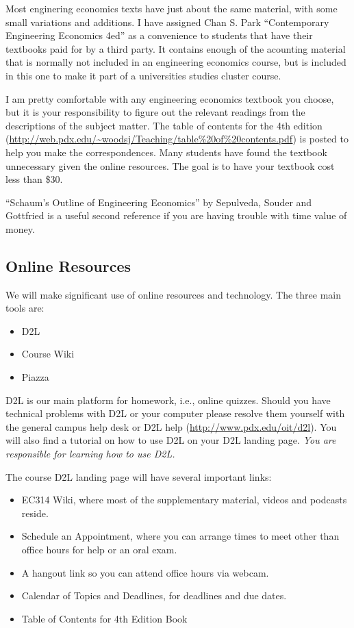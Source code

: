 \documentclass[letterpaper,10pt]{article}
\newif\ifonline
\begin{document}
Most enginering economics texts have just about the same material, with some small variations and additions. I have assigned Chan S. Park ``Contemporary Engineering Economics
4ed'' as a convenience to students that have their textbooks paid for by a third party. It contains enough of the acounting material that is normally not included in an engineering economics course, but is included in this one to make it part of a universities studies cluster course. 


I am pretty comfortable with any engineering economics textbook you choose, but it is your responsibility to figure
out the relevant readings from the descriptions of the subject matter.
The table of contents for the 4th edition (\url{http://web.pdx.edu/~woodsj/Teaching/table\%20of\%20contents.pdf}) is posted to help you
make the correspondences.  Many students have found the textbook unnecessary given the online resources.  The goal is to have your textbook cost less than \$30.

``Schaum's Outline of Engineering Economics'' by Sepulveda, Souder and Gottfried is a useful second reference if you are having trouble with time value of money.

\subsection{Online Resources}
We will make significant use of online resources and technology.  The
three main tools are:
\begin{itemize}
\item D2L
\item Course Wiki
\item Piazza
\end{itemize}

D2L is our main platform for homework, i.e., online quizzes.  Should you have technical problems with D2L
or your computer please resolve them yourself with the general campus
help desk or D2L help (\url{http://www.pdx.edu/oit/d2l}).  You will
also find a tutorial on how to use D2L on your D2L landing page.
\emph{You are responsible for learning how to use D2L.}


The course D2L landing page will have several important links:
\begin{itemize}
  \item EC314 Wiki, where most of the supplementary material, videos and
    podcasts reside.
  \ifonline
    \item Schedule an Appointment, where you can arrange times to meet
    other than office hours for help.
    \else
    \item Schedule an Appointment, where you can arrange times to meet
    other than office hours for help or an oral exam.  
  \fi
  
  \item A hangout link so you can attend office hours via webcam.
  \item Calendar of Topics and Deadlines, for deadlines and due dates.
  \item Table of Contents for 4th Edition Book
\end{itemize}
\end{document}

